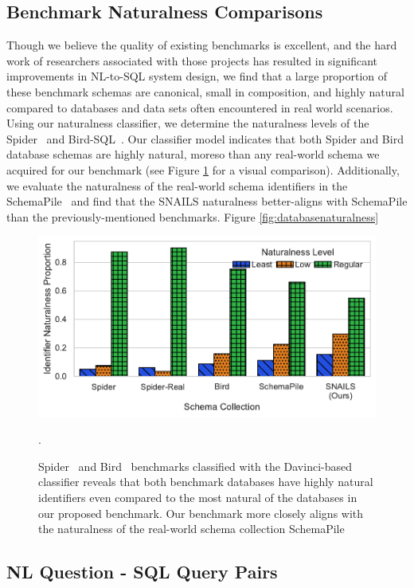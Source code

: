 \subsection{Benchmark Naturalness Comparisons}

Though we believe the quality of existing benchmarks is excellent, and the hard work of researchers associated with those projects has resulted in significant improvements in NL-to-SQL system design, we find that a large proportion of these benchmark schemas are canonical, small in composition, and highly natural compared to databases and data sets often encountered in real world scenarios.
Using our naturalness classifier, we determine the naturalness levels of the Spider~\cite{Yu&al.18c} and Bird-SQL~\cite{li2023llm}.
Our classifier model indicates that both Spider and Bird database schemas are highly natural, moreso than any real-world schema we acquired for our benchmark (see Figure \ref{fig:benchmark-naturalness-comparison-appendix} for a visual comparison).
Additionally, we evaluate the naturalness of the real-world schema identifiers in the SchemaPile~\cite{doehmen2024schemapile} and find that the SNAILS naturalness better-aligns with SchemaPile than the previously-mentioned benchmarks.
Figure \ref{fig:databasenaturalness}

\begin{figure}
  \centering
  \includegraphics[width=0.7\linewidth]{figures/benchmark_naturalness_compare.pdf}
  \caption{Spider~\cite{Yu&al.18c} and Bird~\cite{li2023llm} benchmarks classified with the Davinci-based classifier reveals that both benchmark databases have highly natural identifiers even compared to the most natural of the databases in our proposed benchmark. Our benchmark more closely aligns with the naturalness of the real-world schema collection SchemaPile~\cite{doehmen2024schemapile}}.
  \label{fig:benchmark-naturalness-comparison-appendix}
\end{figure}


\subsection{NL Question - SQL Query Pairs}

